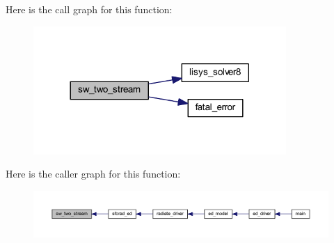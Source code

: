 Here is the call graph for this function\+:\nopagebreak
\begin{figure}[H]
\begin{center}
\leavevmode
\includegraphics[width=272pt]{twostream__rad_8f90_abe93885fe642dcef8db1fb3977179585_cgraph}
\end{center}
\end{figure}




Here is the caller graph for this function\+:\nopagebreak
\begin{figure}[H]
\begin{center}
\leavevmode
\includegraphics[width=350pt]{twostream__rad_8f90_abe93885fe642dcef8db1fb3977179585_icgraph}
\end{center}
\end{figure}


